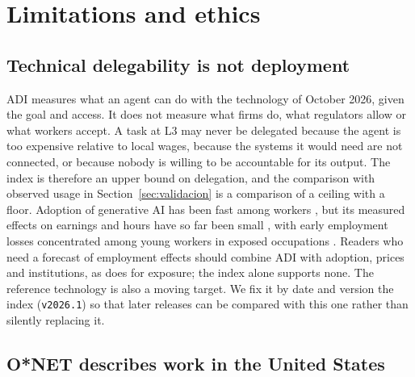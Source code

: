 \section{Limitations and ethics}
\label{sec:limites}

\subsection{Technical delegability is not deployment}

ADI measures what an agent can do with the technology of October 2026, given the goal and access.
It does not measure what firms do, what regulators allow or what workers accept.
A task at L3 may never be delegated because the agent is too expensive relative to local wages, because the systems it would need are not connected, or because nobody is willing to be accountable for its output.
The index is therefore an upper bound on delegation, and the comparison with observed usage in Section~\ref{sec:validacion} is a comparison of a ceiling with a floor.
Adoption of generative AI has been fast among workers \citep{bick2024rapid}, but its measured effects on earnings and hours have so far been small \citep{humlum2025large}, with early employment losses concentrated among young workers in exposed occupations \citep{brynjolfsson2025canaries}.
Readers who need a forecast of employment effects should combine ADI with adoption, prices and institutions, as \citet{acemoglu2024simple} does for exposure; the index alone supports none.
The reference technology is also a moving target.
We fix it by date and version the index (\texttt{v2026.1}) so that later releases can be compared with this one rather than silently replacing it.

\subsection{O*NET describes work in the United States}


